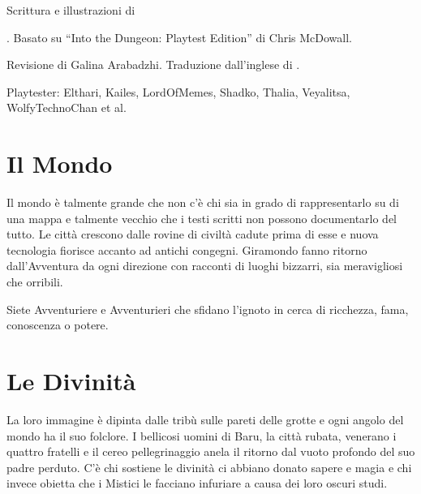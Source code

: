\documentclass[itdr]{subfiles}
\begin{document}
\begin{minipage}{\textwidth}
\toc[2] %
\end{minipage}

\vfill

\begin{minipage}{\textwidth}
\begin{center}\footnotesize
	Scrittura e illustrazioni di \author{}. Basato su ``Into the Dungeon: Playtest Edition'' di Chris McDowall.
	
	Revisione di Galina Arabadzhi. Traduzione dall'inglese di \translator{}.

	Playtester: Elthari, Kailes, LordOfMemes, Shadko, Thalia, Veyalitsa, WolfyTechnoChan et al.
\end{center}
\end{minipage}

\clearpage

\label{ch:introduction}


\section*{Il Mondo}

Il mondo è talmente grande che non c’è chi sia in grado di rappresentarlo su di una mappa e talmente vecchio che i testi scritti non possono documentarlo del tutto. Le città crescono dalle rovine di civiltà cadute prima di esse e nuova tecnologia fiorisce accanto ad antichi congegni. \mbox{Giramondo} fanno ritorno dall'Avventura da ogni direzione con racconti di luoghi bizzarri, sia meravigliosi che orribili.

Siete Avventuriere e Avventurieri che sfidano l’ignoto in cerca di ricchezza, fama, conoscenza o potere.

\vspace{3ex}
\section*{Le Divinità}

La loro immagine è dipinta dalle tribù sulle pareti delle grotte e ogni angolo del mondo ha il suo folclore. I bellicosi uomini di Baru, la città rubata, venerano i quattro fratelli e il cereo pellegrinaggio anela il ritorno dal vuoto profondo del suo padre perduto. C’è chi sostiene le divinità ci abbiano donato sapere e magia e chi invece obietta che i Mistici le facciano infuriare a causa dei loro oscuri studi.
\end{document}
